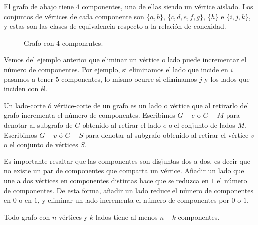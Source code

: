 \begin{ejem}\label{ejem:cortes}
    El grafo de abajo tiene $4$ componentes, una de ellas siendo un vértice aislado. Los conjuntos de vértices de cada componente son $\{a,b\}$, $\{c,d,e,f,g\}$, $\{h\}$ e $\{i,j,k\}$, y estas son las clases de equivalencia respecto a la relación de conexidad.
    
    \begin{figure}
        \centering
        \caption{Grafo con $4$ componentes.}
    \end{figure}
\end{ejem}

Vemos del ejemplo anterior que eliminar un vértice o lado puede incrementar el número de componentes. Por ejemplo, si eliminamos el lado que incide en $i$ pasamos a tener $5$ componentes, lo mismo ocurre si eliminamos $j$ y los lados que inciden con él.

\begin{defn}
    Un \ul{lado-corte} ó \ul{vértice-corte} de un grafo es un lado o vértice que al retirarlo del grafo incrementa el número de componentes. Escribimos $G - e$ o $G - M$ para denotar al subgrafo de $G$ obtenido al retirar el lado $e$ o el conjunto de lados $M$. Escribimos $G - v$ ó $G - S$ para denotar al subgrafo obtenido al retirar el vértice $v$ o el conjunto de vértices $S$.
\end{defn}

Es importante resaltar que las componentes son disjuntas dos a dos, es decir que no existe un par de componentes que comparta un vértice. Añadir un lado que une a dos vértices en componentes distintas hace que se reduzca en $1$ el número de componentes. De esta forma, añadir un lado reduce el número de componentes en $0$ o en $1$, y eliminar un lado incrementa el número de componentes por $0$ o $1$.

\begin{pro}\label{pro:componentes}
    Todo grafo con $n$ vértices y $k$ lados tiene al menos $n-k$ componentes.
\end{pro}

